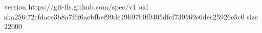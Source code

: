 version https://git-lfs.github.com/spec/v1
oid sha256:72cfdaee3b8a7f6f6aebfbef99de19b97b0f9405dfcf739569e6dec25926e5c0
size 22000
